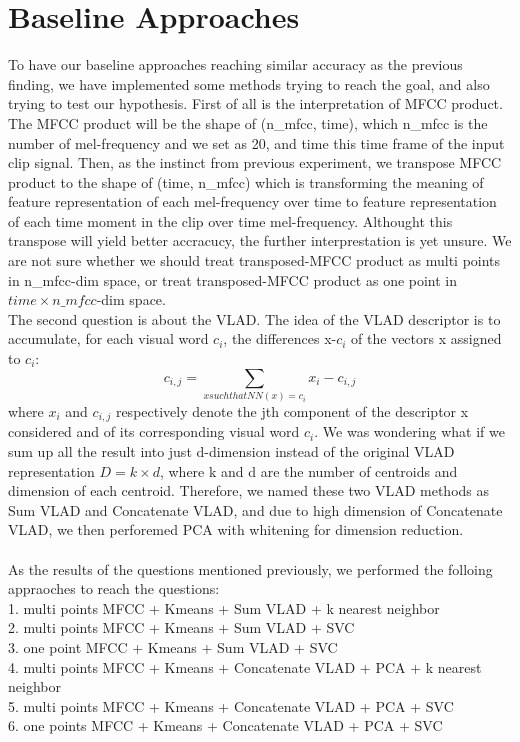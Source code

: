\documentclass[final]{siamltexmm}
\begin{document}
\section{Baseline Approaches}
To have our baseline approaches reaching similar accuracy as the previous finding, we have implemented some methods trying to reach the goal, and also trying to test our hypothesis. First of all is the interpretation of MFCC product. The MFCC product will be the shape of (n\_mfcc, time), which n\_mfcc is the number of mel-frequency and we set as 20, and time this time frame of the input clip signal. Then, as the instinct from previous experiment, we transpose MFCC product to the shape of (time, n\_mfcc) which is transforming the meaning of feature representation of each mel-frequency over time to feature representation of each time moment in the clip over time mel-frequency. Althought this transpose will yield better accracucy, the further interprestation is yet unsure. We are not sure whether we should treat transposed-MFCC product as multi points in n\_mfcc-dim space, or treat transposed-MFCC product as one point in $time \times n\_mfcc$-dim space.
\\The second question is about the VLAD. The idea of the VLAD descriptor is to accumulate, for each visual word $c_{i}$, the differences x-$c_{i}$ of the vectors x assigned to $c_{i}$:
\begin{equation}
c_{i, j} = \sum\limits_{x such that NN(x)=c_{i}} x_{i}-c_{i,j}
\end{equation}
where $x_{i}$ and $c_{i,j}$ respectively denote the jth component of the descriptor x considered and of its corresponding visual word $c_{i}$. We was wondering what if we sum up all the result into just d-dimension instead of the original VLAD representation $D=k\times d$, where k and d are the number of centroids and dimension of each centroid. Therefore, we named these two VLAD methods as Sum VLAD and Concatenate VLAD, and due to high dimension of Concatenate VLAD, we then perforemed PCA with whitening for dimension reduction.
\\\\As the results of the questions mentioned previously, we performed the folloing appraoches to reach the questions:
\\ 1. multi points MFCC + Kmeans + Sum VLAD + k nearest neighbor
\\ 2. multi points MFCC + Kmeans + Sum VLAD + SVC
\\ 3. one point MFCC + Kmeans + Sum VLAD + SVC
\\ 4. multi points MFCC + Kmeans + Concatenate VLAD + PCA + k nearest neighbor
\\ 5. multi points MFCC + Kmeans + Concatenate VLAD + PCA + SVC
\\ 6. one points MFCC + Kmeans + Concatenate VLAD + PCA + SVC
\end{document}

